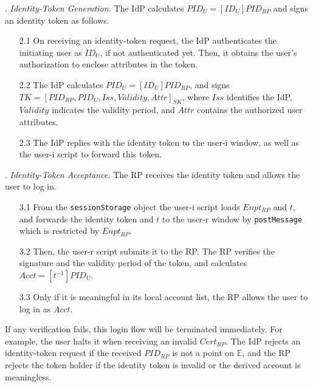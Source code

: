 . {\em Identity-Token Generation.}
The IdP calculates $PID_U = [ID_U]{PID_{RP}}$ and signs an identity token as follows. %
\begin{itemize}
\setlength{\topsep}{0pt}
\setlength{\partopsep}{0pt}
\setlength{\itemsep}{0pt}
\setlength{\parsep}{0pt}
\setlength{\parskip}{0pt}
\item[2.1]
On receiving an identity-token request,
the IdP authenticates the initiating user as $ID_U$, if not authenticated yet.
Then, it obtains the user's authorization to enclose attributes in the token.
\item[2.2]
The IdP calculates $PID_U = [ID_U]{PID_{RP}}$, and signs $TK = [PID_{RP}, PID_U, Iss, Validity, Attr]_{SK}$,
where $Iss$ identifies the IdP, $Validity$ indicates the validity period, and $Attr$ contains the authorized user attributes.
\item[2.3] The IdP replies with the identity token to the user-i window,
    as well as the user-i script to forward this token.
\end{itemize}


. {\em Identity-Token Acceptance.}
The RP receives the identity token and allows the user to log in.
\begin{itemize}
\setlength{\topsep}{0pt}
\setlength{\partopsep}{0pt}
\setlength{\itemsep}{0pt}
\setlength{\parsep}{0pt}
\setlength{\parskip}{0pt}
\item [3.1]
From the \verb+sessionStorage+ object
the user-i script loads $Enpt_{RP}$ and $t$, 
    and forwards the identity token and $t$ to the user-r window by \verb+postMessage+ which is restricted by $Enpt_{RP}$.
\item[3.2] Then, the user-r script submits it to the RP.
The RP verifies the signature and the validity period of the token, 
and calculates $Acct = [t^{-1}]{PID_U}$.

\item[3.3] Only if it is meaningful in its local account list, the RP allows the user to log in as $Acct$.

\end{itemize}

If any verification fails, this login flow will be terminated immediately.
For example, the user halts it when receiving an invalid $Cert_{RP}$.
The IdP rejects an identity-token request if the received $PID_{RP}$ is not a point on $\mathbb{E}$, and the RP rejects the token holder if the identity token is invalid or the derived account is meaningless. 

